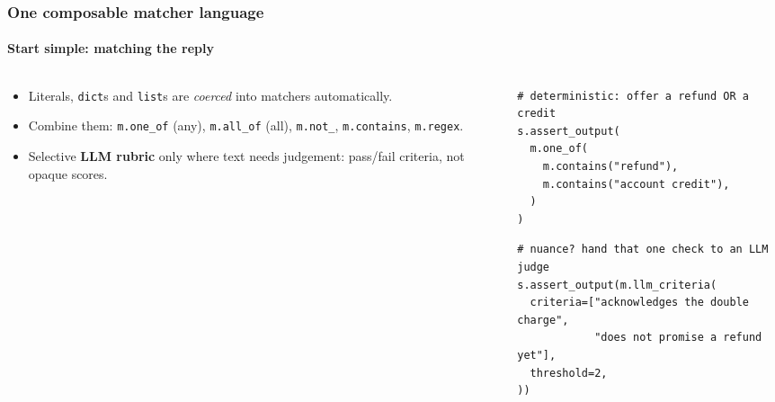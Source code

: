 \documentclass[
	aspectratio=169, %
	t,               %
	onlytextwidth,
	10pt,
]{beamer}
\begin{document}
\begin{frame}[fragile]
	\frametitle{One composable matcher language}
	\framesubtitle{Start simple: matching the reply}
	\begin{columns}[T,onlytextwidth]
		\begin{column}{0.37\linewidth}
			\begin{itemize}
				\setlength\itemsep{0.9em}
				\item Literals, \texttt{dict}s and \texttt{list}s are \emph{coerced} into matchers
				automatically.
				\item Combine them: \texttt{m.one\_of} (any), \texttt{m.all\_of} (all),
				\texttt{m.not\_}, \texttt{m.contains}, \texttt{m.regex}.
				\item Selective \textbf{LLM rubric} only where text needs judgement: pass/fail
				criteria, not opaque scores.
			\end{itemize}
		\end{column}
		\hfill
		\begin{column}{0.55\linewidth}
\begin{lstlisting}
# deterministic: offer a refund OR a credit
s.assert_output(
  m.one_of(
    m.contains("refund"),
    m.contains("account credit"),
  )
)
\end{lstlisting}
			\vspace{0.6em}
\begin{lstlisting}
# nuance? hand that one check to an LLM judge
s.assert_output(m.llm_criteria(
  criteria=["acknowledges the double charge",
            "does not promise a refund yet"],
  threshold=2,
))
\end{lstlisting}
		\end{column}
	\end{columns}
\end{frame}
\end{document}
